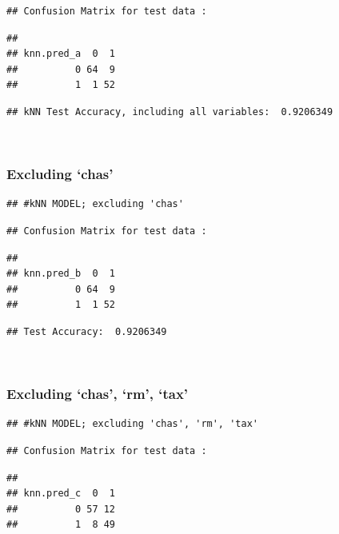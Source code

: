 \documentclass[]{article}
\begin{document}
\begin{verbatim}
## Confusion Matrix for test data :
\end{verbatim}

\begin{verbatim}
##           
## knn.pred_a  0  1
##          0 64  9
##          1  1 52
\end{verbatim}

\begin{verbatim}
## kNN Test Accuracy, including all variables:  0.9206349
\end{verbatim}

~

\subsubsection{\texorpdfstring{Excluding
`chas'}{Excluding chas}}\label{excluding-chas-2}

\begin{verbatim}
## #kNN MODEL; excluding 'chas'
\end{verbatim}

\begin{verbatim}
## Confusion Matrix for test data :
\end{verbatim}

\begin{verbatim}
##           
## knn.pred_b  0  1
##          0 64  9
##          1  1 52
\end{verbatim}

\begin{verbatim}
## Test Accuracy:  0.9206349
\end{verbatim}

~

\subsubsection{\texorpdfstring{Excluding `chas', `rm',
`tax'}{Excluding chas, rm, tax}}\label{excluding-chas-rm-tax-2}

\begin{verbatim}
## #kNN MODEL; excluding 'chas', 'rm', 'tax'
\end{verbatim}

\begin{verbatim}
## Confusion Matrix for test data :
\end{verbatim}

\begin{verbatim}
##           
## knn.pred_c  0  1
##          0 57 12
##          1  8 49
\end{verbatim}
\end{document}
